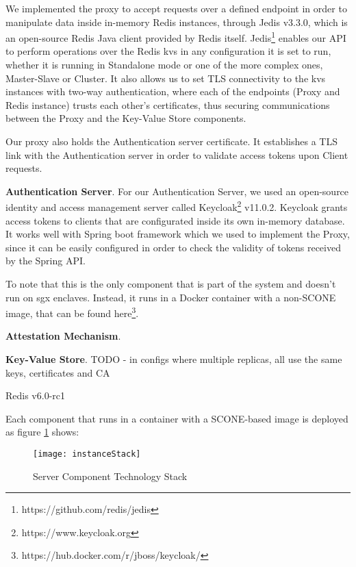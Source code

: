 We implemented the proxy to accept requests over a defined endpoint in order to manipulate data inside in-memory Redis instances, through Jedis v3.3.0, which is an open-source Redis Java client provided by Redis itself. Jedis\footnote{https://github.com/redis/jedis} enables our API to perform operations over the Redis \gls{kvs} in any configuration it is set to run, whether it is running in Standalone mode or one of the more complex ones, Master-Slave or Cluster. It also allows us to set TLS connectivity to the \gls{kvs} instances with two-way authentication, where each of the endpoints (Proxy and Redis instance) trusts each other's certificates, thus securing communications between the Proxy and the Key-Value Store components.

Our proxy also holds the Authentication server certificate. It establishes a TLS link with the Authentication server in order to validate access tokens upon Client requests.

\vspace{3mm}
\textbf{Authentication Server}. For our Authentication Server, we used an open-source identity and access management server called Keycloak\footnote{https://www.keycloak.org} v11.0.2. Keycloak grants access tokens to clients that are configurated inside its own in-memory database. It works well with Spring boot framework which we used to implement the Proxy, since it can be easily configured in order to check the validity of tokens received by the Spring API.

To note that this is the only component that is part of the system and doesn't run on \gls{sgx} enclaves. Instead, it runs in a Docker container with a non-SCONE image, that can be found here\footnote{https://hub.docker.com/r/jboss/keycloak/}.

\vspace{3mm}
\textbf{Attestation Mechanism}.

\vspace{3mm}
\textbf{Key-Value Store}.
TODO - in configs where multiple replicas, all use the same keys, certificates and CA

Redis v6.0-rc1

\vspace{3mm}
Each component that runs in a container with a SCONE-based image is deployed as figure \ref{fig:instanceStack} shows:
\begin{figure}[htbp]
	\centering
	{\texttt{[image: instanceStack]}}
	\caption{Server Component Technology Stack}
	\label{fig:instanceStack}
\end{figure}

